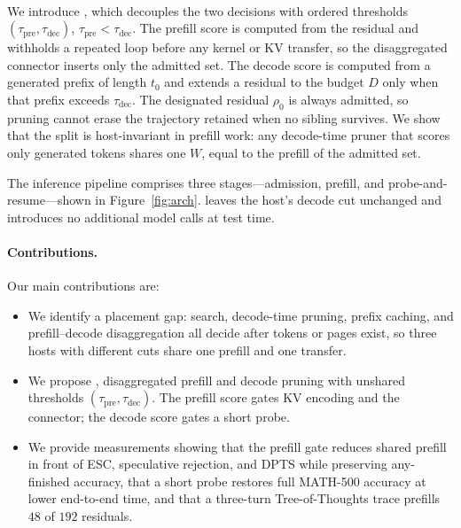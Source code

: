 \paragraph{\sys}
We introduce \sys, which decouples the two decisions with ordered thresholds $(\tau_{\mathrm{pre}}, \tau_{\mathrm{dec}})$, $\tau_{\mathrm{pre}} < \tau_{\mathrm{dec}}$.
The prefill score is computed from the residual and withholds a repeated loop before any kernel or KV transfer, so the disaggregated connector inserts only the admitted set.
The decode score is computed from a generated prefix of length $t_0$ and extends a residual to the budget $D$ only when that prefix exceeds $\tau_{\mathrm{dec}}$.
The designated residual $\rho_0$ is always admitted, so pruning cannot erase the trajectory retained when no sibling survives.
We show that the split is host-invariant in prefill work: any decode-time pruner that scores only generated tokens shares one $W$, equal to the prefill of the admitted set.

The inference pipeline comprises three stages---admission, prefill, and probe-and-resume---shown in Figure~\ref{fig:arch}.
\sys leaves the host's decode cut unchanged and introduces no additional model calls at test time.

\paragraph{Contributions.}
Our main contributions are:
\begin{itemize}
\item We identify a placement gap: search, decode-time pruning, prefix caching, and prefill--decode disaggregation all decide after tokens or pages exist, so three hosts with different cuts share one prefill and one transfer.
\item We propose \sys, disaggregated prefill and decode pruning with unshared thresholds $(\tau_{\mathrm{pre}}, \tau_{\mathrm{dec}})$. The prefill score gates KV encoding and the connector; the decode score gates a short probe.
\item We provide measurements showing that the prefill gate reduces shared prefill in front of ESC, speculative rejection, and DPTS while preserving any-finished accuracy, that a short probe restores full MATH-500 accuracy at lower end-to-end time, and that a three-turn Tree-of-Thoughts trace prefills $48$ of $192$ residuals.
\end{itemize}
